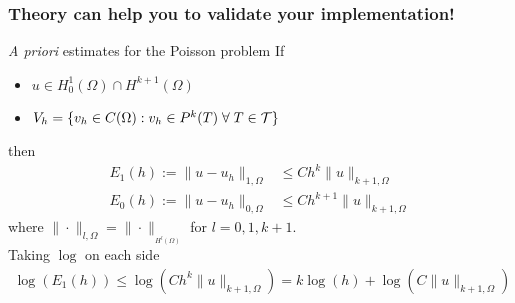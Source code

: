 \begin{frame}[t]
    \frametitle{Theory can help you to validate your implementation!}
    \begin{block}{\emph{A priori} estimates for the Poisson problem}
        If
        \begin{itemize}
            \item $u \in H_0^1(\Omega) \cap H^{k+1}(\Omega)$
            \item $V_h = \{ v_h \in C(\Omega) : v_h \in P^k(T) \; \forall \; T \in
        \mathcal{T}\}$
        \end{itemize}
        then
        \vspace{-1em}
        \begin{align*}
         E_1(h) := \| u - u_h \|_{1,\Omega} &\leq C h^{k} \|u\|_{k+1,\Omega}
            \\
         E_0(h) :=  \| u - u_h \|_{0,\Omega} &\leq C h^{k+1} \|u\|_{k+1,\Omega}
        \end{align*}
        where  $\| \cdot \|_{l,\Omega} = \| \cdot \|_{_{H^l(\Omega)}}$
        for $l = 0,1,k+1$. \\
        {Taking $\log$ on each side
        \begin{align*}
            \log(E_1(h)) \leq \log( C h^{k} \|u\|_{k+1,\Omega})
            = k \log(h) + \log(C \|u\|_{k+1,\Omega})
        \end{align*}
    }
    \end{block}
\end{frame}

